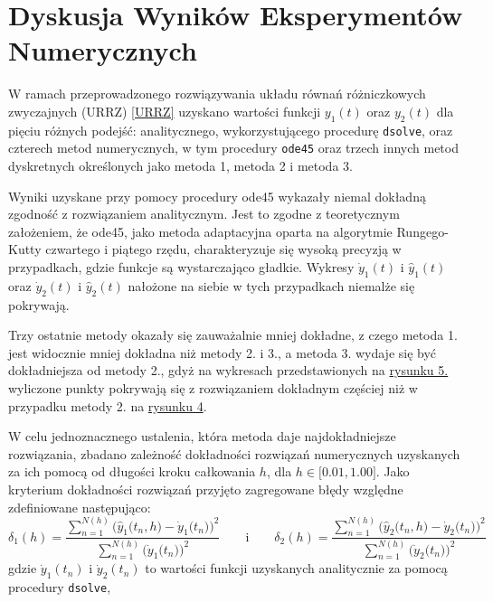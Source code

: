 \documentclass[a4paper, 12pt, twoside, openany]{article}
\begin{document}
    \section{Dyskusja Wyników Eksperymentów Numerycznych}
    W ramach przeprowadzonego rozwiązywania układu równań różniczkowych zwyczajnych (URRZ) \eqref{URRZ}
    uzyskano wartości funkcji $y_1(t)$ oraz $y_2(t)$ dla pięciu różnych podejść:
    analitycznego, wykorzystującego procedurę \texttt{dsolve}, oraz czterech metod numerycznych,
    w tym procedury \texttt{ode45} oraz trzech innych metod dyskretnych określonych jako metoda 1, metoda 2 i metoda 3.
    \\\par\noindent
    Wyniki uzyskane przy pomocy procedury ode45 wykazały niemal dokładną zgodność z rozwiązaniem analitycznym.
    Jest to zgodne z teoretycznym założeniem, że ode45, jako metoda adaptacyjna oparta na algorytmie Rungego-Kutty czwartego i piątego rzędu,
    charakteryzuje się wysoką precyzją w przypadkach, gdzie funkcje są wystarczająco gładkie.
    Wykresy $\dot{y}_1(t)$ i $\hat{y}_1(t)$ oraz $\dot{y}_2(t)$ i $\hat{y}_2(t)$ nałożone na siebie w tych przypadkach niemalże się pokrywają.
    \\\par\noindent
    Trzy ostatnie metody okazały się zauważalnie mniej dokładne, z czego metoda 1. jest widocznie mniej dokładna niż metody 2. i 3.,
    a metoda 3. wydaje się być dokładniejsza od metody 2., gdyż na wykresach przedstawionych na \hyperref[fig:rys5]{rysunku 5.}
    wyliczone punkty pokrywają się z rozwiązaniem dokładnym częściej niż w przypadku metody 2. na \hyperref[fig:rys5]{rysunku 4}.
    \\\par\noindent
    W celu jednoznacznego ustalenia, która metoda daje najdokładniejsze rozwiązania,
    zbadano zależność dokładności rozwiązań numerycznych uzyskanych za ich pomocą od długości kroku całkowania $h$, dla $h \in \big[0.01, 1.00\big]$.
    Jako kryterium dokładności rozwiązań przyjęto zagregowane błędy względne zdefiniowane następująco:
    $$
    \delta_1(h) = \dfrac
    {\sum_{n=1}^{N(h)}\bigg( \hat{y}_1\Big(t_n,h\Big) - \dot{y}_1\Big(t_n\Big) \bigg)^2}
    {\sum_{n=1}^{N(h)}\bigg(\dot{y}_1\Big(t_n\Big)\bigg)^2}
    \qquad \text{i} \qquad
    \delta_2(h) = \dfrac
    {\sum_{n=1}^{N(h)}\bigg( \hat{y}_2\Big(t_n,h\Big) - \dot{y}_2\Big(t_n\Big) \bigg)^2}
    {\sum_{n=1}^{N(h)}\bigg(\dot{y}_2\Big(t_n\Big)\bigg)^2}
    $$
    gdzie $\dot{y}_1(t_n)$ i $\dot{y}_2(t_n)$ to wartości funkcji uzyskanych analitycznie za pomocą procedury \texttt{dsolve},
\end{document}
